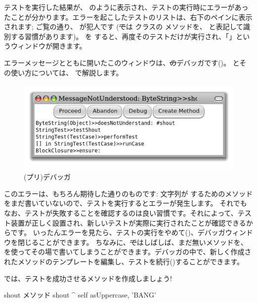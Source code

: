 \documentclass[a4paper,10pt,twoside]{book}
\begin{document}
テストを実行した結果が、 のように表示され、テストの実行時にエラーがあったことが分かります。エラーを起こしたテストのリストは、右下のペインに表示されます; ご覧の通り、 が犯人です
(\st では  クラスの  メソッドを、 と表記して識別する習慣があります)。
 を \click すると、再度そのテストだけが実行され、「」というウィンドウが開きます。

エラーメッセージとともに開いたこのウィンドウは、\st のデバッガです()。
とその使い方については、 で解説します。

\begin{figure}[hbt]
\centerline {\includegraphics[width=\textwidth]{Predebugger}}
\caption{(プリ)デバッガ}
\end{figure}

このエラーは、もちろん期待した通りのものです: 文字列が  するためのメソッドをまだ書いていないので、テストを実行するとエラーが発生します。
それでもなお、テストが失敗することを確認するのは良い習慣です。それによって、テスト装置が正しく設置され、新しいテストが実際に実行されたことが確認できるからです。
いったんエラーを見たら、テストの実行をやめて()、デバッガウィンドウを閉じることができます。
ちなみに、\st ではしばしば、まだ無いメソッドを、 を使ってその場で書いてしまうことができます。デバッガの中で、新しく作成されたメソッドのテンプレートを編集し、テストを続行()することができます。

では、テストを成功させるメソッドを作成しましょう!

\begin{method}[shout]{shout メソッド}
shout
	^ self asUppercase, 'BANG'
\end{method}
\end{document}
